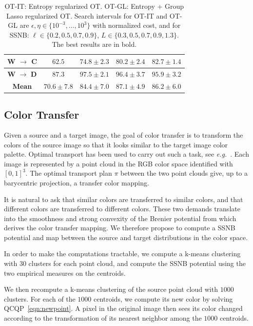 \begin{table}[!h]
{\begin{tabular}{|c|c|c|c|c|}
            \textbf{W} $\boldsymbol{\rightarrow}$ \textbf{C} & $62.5$ & $74.8\pm2.3$ & $80.2\pm2.4$ & $\boldsymbol{82.7\pm1.4}$ \\ \hline
            \textbf{W} $\boldsymbol{\rightarrow}$ \textbf{D} & $87.3$ & $\boldsymbol{97.5\pm2.1}$ & $\boldsymbol{96.4\pm3.7}$ & $\boldsymbol{95.9\pm3.2}$ \\ \hdashline
            \textbf{Mean} & $70.6\pm7.8$ & $\boldsymbol{84.4\pm7.0}$ & $\boldsymbol{87.1\pm4.9}$ & $\boldsymbol{86.2\pm6.0}$ \\ \hline
        \end{tabular}
    }
    \caption{OT-IT: Entropy regularized OT. OT-GL: Entropy + Group Lasso regularized OT. Search intervals for OT-IT and OT-GL are $\epsilon, \eta \in \{10^{-3}, \ldots,10^{3}\}$ with normalized cost, and for SSNB: $\ell \in \{0.2, 0.5, 0.7, 0.9\}$, $L \in \{0.3, 0.5, 0.7, 0.9, 1.3\}$. The best results are in bold.}\label{table:DA}
\end{table}


\subsection{Color Transfer}

Given a source and a target image, the goal of color transfer is to transform the colors of the source image so that it looks similar to the target image color palette. Optimal transport has been used to carry out such a task, see \emph{e.g.}~\citep{bonneel2015sliced, ferradans2014regularized, rabin2014adaptive}. Each image is represented by a point cloud in the RGB color space identified with $[0,1]^3$. The optimal transport plan $\pi$ between the two point clouds give, up to a barycentric projection, a transfer color mapping.

It is natural to ask that similar colors are transferred to similar colors, and that different colors are transferred to different colors. These two demands translate into the smoothness and strong convexity of the Brenier potential from which derives the color transfer mapping. We therefore propose to compute a SSNB potential and map between the source and target distributions in the color space.

In order to make the computations tractable, we compute a k-means clustering with $30$ clusters for each point cloud, and compute the SSNB potential using the two empirical measures on the centroids.

We then recompute a k-means clustering of the source point cloud with $1000$ clusters. For each of the $1000$ centroids, we compute its new color by solving QCQP~\eqref{eqn:newpoint}. A pixel in the original image then sees its color changed according to the transformation of its nearest neighbor among the $1000$ centroids.


